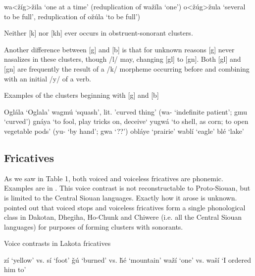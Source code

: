 \documentclass[output=paper]{LSP/langsci}
\begin{document}
\begin{exe}\label{ex:rood:2}
\ex\label{ex:rood:1}
 \begin{xlist}
\ex wa<\v{z}\'ig>\v{z}ila `one at a time' (reduplication of wa\v{z}\'ila `one')
\ex o<\v{z}\'ug>\v{z}ula `several to be full', reduplication of o\v{z}\'ula `to be full')
\end{xlist}
\end{exe}

Neither [k] nor [kh] ever occurs in obstruent-sonorant clusters. 

Another difference between [g] and [b] is that for unknown reasons [g] never nasalizes in these clusters, though /l/ may, changing [gl] to [gn]. Both [gl] and [gn] are frequently the result of a /k/ morpheme occurring before and combining with an initial /y/ of a verb.

\begin{exe}\label{ex:rood:3}
\ex Examples of the clusters beginning with [g] and [b]
\begin{xlist}
\ex Ogl\'ala `Oglala'
\ex wagm\'u `squash', lit. 'curved thing' (wa- `indefinite patient'; gmu `curved')
\ex gn\'aya `to fool, play tricks on, deceive`
\ex yugw\'a `to shell, as corn; to open vegetable pods' (yu- `by hand'; gwa `??')
\ex obl\'aye `prairie'
\ex wabl\'i `eagle'
\ex bl\'e `lake'
\end{xlist}
\end{exe}

\subsection{Fricatives}

As we saw in Table 1, both voiced and voiceless fricatives are phonemic. Examples are in . This voice contrast is not reconstructable to Proto-Siouan, but is limited to the Central Siouan languages. Exactly how it arose is unknown. \citet{Miner1979a} pointed out that voiced stops and voiceless fricatives form a single phonological class in Dakotan, Dhegiha, Ho-Chunk and Chiwere (i.e. all the Central Siouan languages) for purposes of forming clusters with sonorants.

\begin{exe}\label{ex:rood:4}
\ex Voice contrasts in Lakota fricatives
\begin{xlist}
\ex z\'i `yellow' vs. s\'i `foot'
\ex \v{g}\'u `burned' vs. \v{h}\'e `mountain'
\ex wa\v{z}\'i `one' vs. wa\v{s}\'i `I ordered him to'
\end{xlist}
\end{exe}
\end{document}
